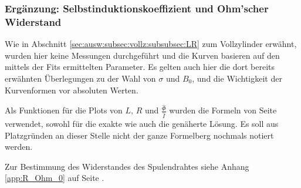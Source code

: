 {	\begin{minipage}[t]{0.33\textwidth}
        \vspace{0pt}
        \subsubsection{%
            Erg\"anzung: Selbstinduktionskoeffizient und Ohm'scher Widerstand}
        \label{sec:ausw:subsec:hohlz:cu:subsubsec:LR}

        Wie   in    Abschnitt   \ref{sec:ausw:subsec:vollz:subsubsec:LR}   zum
        Vollzylinder erw\"ahnt, wurden hier keine Messungen durchgef\"uhrt und
        die Kurven basieren auf den mittels der Fits ermittelten Parameter. Es
        gelten auch  hier die dort  bereits erw\"ahnten \"Uberlegungen  zu der
        Wahl von $\sigma$ und $B_0$,  und die Wichtigkeit der Kurvenformen vor
        absoluten Werten.

        Als    Funktionen    f\"ur    die    Plots   von    $L$,    $R$    und
        $\frac{\hat{\Phi}}{\hat{I}}$    wurden   die    Formeln   von    Seite
        \pageref{eq:hohlzylinder:phiNormExact}  verwendet,   sowohl  f\"ur die
        exakte wie  auch die gen\"aherte L\"osung. Es  soll aus Platzgr\"unden
        an dieser Stelle nicht der ganze Formelberg nochmals notiert werden.

        Zur  Bestimmung  des  Widerstandes   des  Spulendrahtes  siehe  Anhang
        \ref{app:R_Ohm_0} auf Seite \pageref{app:R_Ohm_0}.

        \vspace{2em}
        \begin{minipage}[c][][b]{0.5\textwidth}
            \vspace{0pt}
            
        \end{minipage}%
        \begin{minipage}[c][][b]{0.5\textwidth}
            \vspace{0pt}
            
        \end{minipage}
	\end{minipage}%
	\begin{minipage}[t]{0.67\textwidth}
        \vspace{0mm}
        \resizebox{.95\textwidth}{!}{}
        \label{fig:cu:freq:L}
        \resizebox{.95\textwidth}{!}{}
        \label{fig:cu:freq:R}
	\end{minipage}

}
